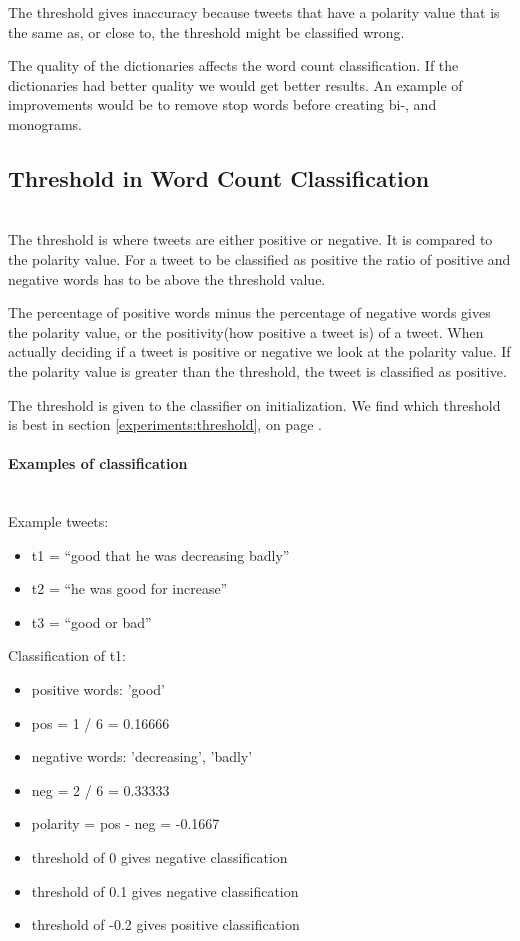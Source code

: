 The threshold gives inaccuracy because tweets that have a polarity value that
is the same as, or close to, the threshold might be classified wrong. 

The quality of the dictionaries affects the word count classification. If the
dictionaries had better quality we would get better results. An example of
improvements would be to remove stop words before creating bi-, and monograms.

\subsection{Threshold in Word Count Classification}\label{sentiment:threshold} 
\hspace{0pt}\\ 

The threshold is where tweets are either positive or negative. It is compared
to the polarity value. For a tweet to be classified as positive the ratio of
positive and negative words has to be above the threshold value. 

The percentage of positive words minus the percentage of negative words gives
the polarity value, or the positivity(how positive a tweet is) of a tweet. 
When actually deciding if a tweet is positive or negative we look at the
polarity value. If the polarity value is greater than the threshold, the tweet is classified as positive. 

The threshold is given to the classifier on initialization. We find which
threshold is best in section \ref{experiments:threshold}, on page 
\pageref{experiments:threshold}.

\paragraph{Examples of classification} 
\hspace{0pt}\\ 
Example tweets:
\begin{itemize}
    \item t1 = “good that he was decreasing badly”
    \item t2 = “he was good for increase” 
    \item t3 = “good or bad”
\end{itemize}

Classification of t1:
\begin{itemize}
	\item positive words: 'good' 
    \item pos = 1 / 6 = 0.16666
	\item negative words: 'decreasing', 'badly'
    \item neg = 2 / 6 = 0.33333
    \item polarity = pos - neg = -0.1667
    \item threshold of 0 gives negative classification
    \item threshold of 0.1 gives negative classification
    \item threshold of -0.2 gives positive classification
\end{itemize}


